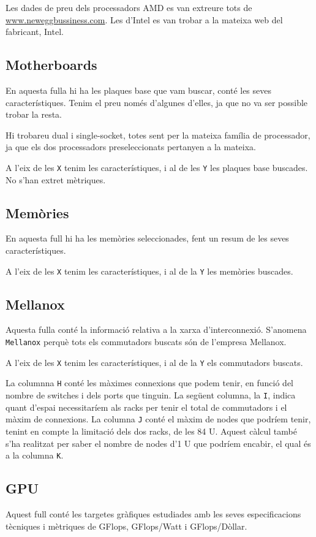 Les dades de preu dels processadors AMD es van extreure tots de \url{www.neweggbussiness.com}. Les d'Intel es van trobar a la mateixa web del fabricant, Intel.

\subsection{Motherboards}
En aquesta fulla hi ha les plaques base que vam buscar, conté les seves característiques. Tenim el preu només d'algunes d'elles, ja que no va ser possible trobar la resta.

Hi trobareu dual i single-socket, totes sent per la mateixa família de processador, ja que els dos processadors preseleccionats pertanyen a la mateixa.

A l'eix de les \texttt{X} tenim les característiques, i al de les \texttt{Y} les plaques base buscades. No s'han extret mètriques.

\subsection{Memòries}
En aquesta full hi ha les memòries seleccionades, fent un resum de les seves característiques.

A l'eix de les \texttt{X} tenim les característiques, i al de la \texttt{Y} les memòries buscades.

\subsection{Mellanox}
Aquesta fulla conté la informació relativa a la xarxa d'interconnexió. S'anomena \texttt{Mellanox} perquè tots els commutadors buscats són de l'empresa Mellanox.

A l'eix de les \texttt{X} tenim les característiques, i al de la \texttt{Y} els commutadors buscats.

La columnna \texttt{H} conté les màximes connexions que podem tenir, en funció del nombre de switches i dels ports que tinguin. 
La següent columna, la \texttt{I}, indica quant d'espai necessitaríem als racks per tenir el total de commutadors i el màxim de connexions.
La columna \texttt{J} conté el màxim de nodes que podríem tenir, tenint en compte la limitació dels dos racks, de les 84 U. 
Aquest càlcul també s'ha realitzat per saber el nombre de nodes d'1 U que podríem encabir, el qual és a la columna \texttt{K}.

\subsection{GPU}
Aquest full conté les targetes gràfiques estudiades amb les seves especificacions tècniques i mètriques de GFlops, GFlops/Watt i GFlops/Dòllar.

